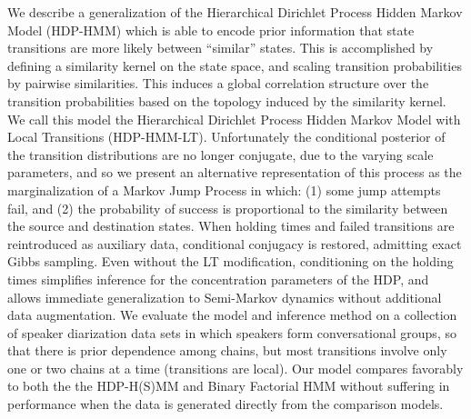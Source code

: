 We describe a generalization of the Hierarchical Dirichlet Process Hidden Markov Model (HDP-HMM) which is able to encode prior information that state transitions are more likely between ``similar'' states.  This is accomplished by defining a similarity kernel on the state space, and scaling transition probabilities by pairwise similarities. This induces a global correlation structure over the transition probabilities based on the topology induced by the similarity kernel.  We call this model the Hierarchical Dirichlet Process Hidden Markov Model with Local Transitions (HDP-HMM-LT). Unfortunately the conditional posterior of the transition distributions are no longer conjugate, due to the varying scale parameters, and so we present an alternative representation of this process as the marginalization of a Markov Jump Process in which: (1) some jump attempts fail, and (2) the probability of success is proportional to the similarity between the source and destination states. When holding times and failed transitions are reintroduced as auxiliary data, conditional conjugacy is restored, admitting exact Gibbs sampling.  Even without the LT modification, conditioning on the holding times simplifies inference for the concentration parameters of the HDP, and allows immediate generalization to Semi-Markov dynamics without additional data augmentation.  We evaluate the model and inference method on a collection of speaker diarization data sets in which speakers form conversational groups, so that there is prior dependence among chains, but most transitions involve only one or two chains at a time (transitions are local).  Our model compares favorably to both the the HDP-H(S)MM and Binary Factorial HMM without suffering in performance when the data is generated directly from the comparison models.
